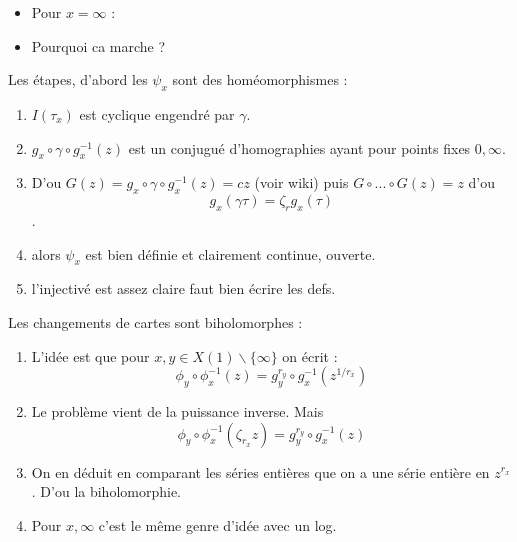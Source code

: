 \documentclass[12pt]{article}
\theoremstyle{plain}
\theoremstyle{definition}
\theoremstyle{remark}
\newcommand{\C}{\mathbb{C}}
\begin{document}
\begin{itemize}
    \item Pour $x=\infty$ :
\end{itemize}

\begin{center}
\end{center}
\newpage

\begin{itemize}
    \item Pourquoi ca marche ? 
\end{itemize}

Les étapes, d'abord les $\psi_x$ sont des homéomorphismes :

\begin{enumerate}
    \item $I(\tau_x)$ est cyclique engendré par $\gamma$.
    \item $g_x\circ\gamma\circ g_x^{-1}(z)$ est un conjugué d'homographies ayant pour points fixes $0,\infty$.
    \item D'ou $G(z)=g_x\circ\gamma\circ g_x^{-1}(z)=cz$ (voir wiki) puis $G\circ...\circ G(z)=z$ d'ou $$g_x(\gamma \tau)=\zeta_rg_x(\tau)$$.
    \item alors $\psi_x$ est bien définie et clairement continue, ouverte.
    \item l'injectivé est assez claire faut bien écrire les defs.
\end{enumerate}

\noindent Les changements de cartes sont biholomorphes :
\begin{enumerate}
    \item L'idée est que pour $x,y\in X(1)\backslash \{\infty\}$ on écrit :$$\phi_y\circ\phi_x^{-1}(z)=g_y^{r_y}\circ g_x^{-1}(z^{1/r_x})$$
    \item Le problème vient de la puissance inverse. Mais $$\phi_y\circ\phi_x^{-1}(\zeta_{r_x}z)=g_y^{r_y}\circ g_x^{-1}(z)$$
    \item On en déduit en comparant les séries entières que on a une série entière en $z^{r_x}$. D'ou la biholomorphie.
    \item Pour $x,\infty$ c'est le même genre d'idée avec un log.
\end{enumerate}
\newpage
\end{document}
